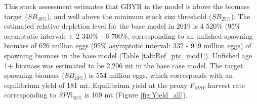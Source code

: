 \documentclass[12pt,]{article}
\begin{document}
This stock assessment estimates that GBYR in the model is above the
biomass target (\(SB_{40\%}\)), and well above the minimum stock size
threshold (\(SB_{25\%}\)). The estimated relative depletion level for
the base model in 2019 is 4 520\% (95\% asymptotic interval: \(\pm\) 2
340\% - 6 700\%, corresponding to an unfished spawning biomass of 626
million eggs (95\% asymptotic interval: 332 - 919 million eggs) of
spawning biomass in the base model (Table \ref{tab:Ref_pts_mod1}).
Unfished age 1+ biomass was estimated to be 2,206 mt in the base case
model. The target spawning biomass (\(SB_{40\%}\)) is 554 million eggs,
which corresponds with an equilibrium yield of 181 mt. Equilibrium yield
at the proxy \(F_{MSY}\) harvest rate corresponding to \(SPR_{50\%}\) is
169 mt (Figure \ref{fig:Yield_all}).

\FloatBarrier
\end{document}
